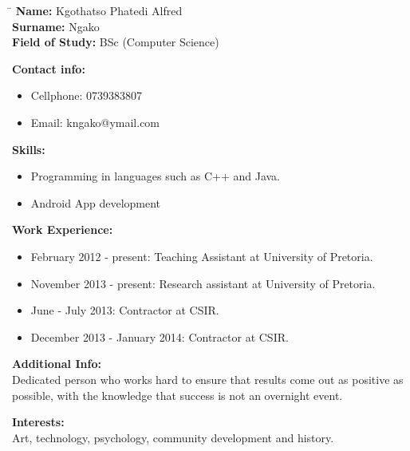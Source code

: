 \documentclass[12pt]{article}
\begin{document}
	\begin{flushleft}
		\begin{tabbing}
			\hspace*{4cm}\=\hspace*{3cm}\kill
			\textbf{Name:} \> Kgothatso Phatedi Alfred \\	
			\textbf{Surname:} \> Ngako \\
			\textbf{Field of Study:} \> BSc (Computer Science)
		\end{tabbing}
		
		\textbf{Contact info:}	
		\begin{itemize}
			\item Cellphone: 0739383807
			\item Email: kngako@ymail.com
		\end{itemize}
		
	
	
		\textbf{Skills:}
		\begin{itemize}
			\item Programming in languages such as C++ and Java.
			\item Android App development
		\end{itemize}
	
		\textbf{Work Experience:}
		\begin{itemize}
			\item February 2012 - present: Teaching Assistant at University of Pretoria.
			\item November 2013 - present: Research assistant at University of Pretoria.
			\item June - July 2013: Contractor at CSIR.
			\item December 2013 - January 2014: Contractor at CSIR.
		\end{itemize}
	
		\textbf{Additional Info:} \\
		\vspace{0.1in}
	 	Dedicated person who works hard to ensure that results come out as positive as possible, with the knowledge that success is not an overnight event.\\
		\vspace{0.1in}
		
		\textbf{Interests:} \\
		\vspace{0.1in}
	 	Art, technology, psychology, community development and history.  \\
	 	\vspace{0.1in}
	\end{flushleft}
\end{document}
